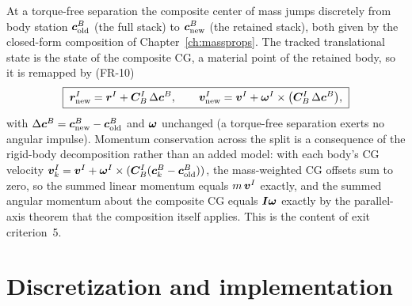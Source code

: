 At a torque-free separation the composite center of mass jumps discretely
from body station $\bm{c}_{\mathrm{old}}^{B}$ (the full stack) to
$\bm{c}_{\mathrm{new}}^{B}$ (the retained stack), both given by the
closed-form composition of Chapter~\ref{ch:massprops}. The tracked
translational state is the state of the composite CG, a material point of the
retained body, so it is remapped by (FR-10)
\begin{equation}
  \boxed{\;
  \bm{r}_{\mathrm{new}}^{I} = \bm{r}^{I} + \bm{C}_{B}^{I}\,\Delta\bm{c}^{B},
  \qquad
  \bm{v}_{\mathrm{new}}^{I} = \bm{v}^{I}
    + \bm{\omega}^{I} \times \bigl(\bm{C}_{B}^{I}\,\Delta\bm{c}^{B}\bigr),
  \;}
  \label{eq:vehicle6dof:remap}
\end{equation}
with $\Delta\bm{c}^{B} = \bm{c}_{\mathrm{new}}^{B} -
\bm{c}_{\mathrm{old}}^{B}$ and $\bm{\omega}$ unchanged (a torque-free
separation exerts no angular impulse). Momentum conservation across the split
is a consequence of the rigid-body decomposition rather than an added model:
with each body's CG velocity $\bm{v}_{k}^{I} = \bm{v}^{I} +
\bm{\omega}^{I}\times(\bm{C}_{B}^{I}(\bm{c}_{k}^{B} - \bm{c}_{\mathrm{old}}^{B}))$,
the mass-weighted CG offsets sum to zero, so the summed linear momentum equals
$m\,\bm{v}^{I}$ exactly, and the summed angular momentum about the composite
CG equals $\bm{I}\bm{\omega}$ exactly by the parallel-axis theorem that the
composition itself applies. This is the content of exit criterion~5.

\section{Discretization and implementation}
\label{sec:vehicle6dof:implementation}

